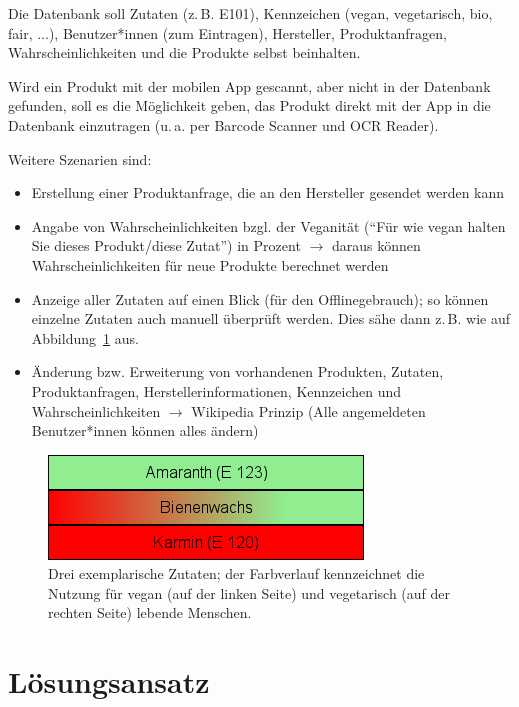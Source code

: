 \documentclass[a4paper]{report}
\begin{document}
Die Datenbank soll Zutaten (z.\,B. E101), Kennzeichen (vegan,
vegetarisch, bio, fair, ...), Benutzer*innen (zum Eintragen), Hersteller,
Produktanfragen, Wahrscheinlichkeiten und die Produkte selbst beinhalten.

Wird ein Produkt mit der mobilen App gescannt, aber nicht in der
Datenbank gefunden, soll es die Möglichkeit geben, das Produkt
direkt mit der App in die Datenbank einzutragen (u.\,a. per Barcode
Scanner und OCR Reader).

Weitere Szenarien sind:

\begin{itemize}
	\item Erstellung einer Produktanfrage, die an den Hersteller
			gesendet werden kann
	\item Angabe von Wahrscheinlichkeiten bzgl. der Veganität (``Für
			wie vegan halten Sie dieses Produkt/diese Zutat'') in Prozent
			$\rightarrow$ daraus können Wahrscheinlichkeiten für
			neue Produkte berechnet werden
	\item Anzeige aller Zutaten auf einen Blick (für den
			Offlinegebrauch); so können einzelne Zutaten auch manuell
			überprüft werden. Dies sähe dann z.\,B. wie auf
			Abbildung~\ref{img:inhaltsstoffe_example} aus.
	\item Änderung bzw. Erweiterung von vorhandenen
			Produkten, Zutaten, Produktanfragen,
			Herstellerinformationen, Kennzeichen und
			Wahrscheinlichkeiten $\rightarrow$ Wikipedia Prinzip (Alle
			angemeldeten Benutzer*innen können alles ändern)
\end{itemize}

\begin{figure}[ht]
	\centering
	\includegraphics{inhaltsstoffe_example-html.png}
	\caption{Drei exemplarische Zutaten; der Farbverlauf kennzeichnet
	die Nutzung für vegan (auf der linken Seite) und vegetarisch (auf
	der rechten Seite) lebende Menschen.}
	\label{img:inhaltsstoffe_example}
\end{figure}

\chapter{Lösungsansatz}
\label{chap:loesungsansatz}
\end{document}
